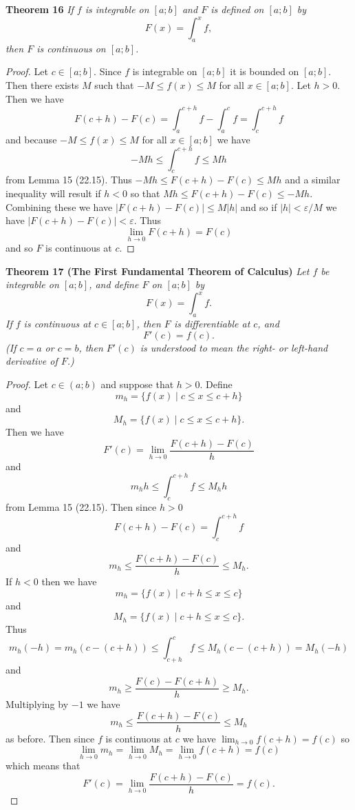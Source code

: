 \documentclass{article}
\begin{document}
\begin{flushleft}
\textbf{Theorem 16}
\textsl{If $f$ is integrable on $[a;b]$ and $F$ is defined on $[a;b]$ by
\[
F(x) = \int_a^x f,
\]
then $F$ is continuous on $[a;b]$.}
\begin{proof}
Let $c \in [a;b]$. Since $f$ is integrable on $[a;b]$ it is bounded on $[a;b]$. Then there exists $M$ such that $-M \leq f(x) \leq M$ for all $x \in [a;b]$. Let $h > 0$. Then we have
\[
F(c+h) - F(c) = \int_a^{c+h} f - \int_a^c f = \int_c^{c+h} f
\]
and because $-M \leq f(x) \leq M$ for all $x \in [a;b]$ we have
\[
-M h \leq \int_c^{c+h} f \leq M h
\]
from Lemma 15 (22.15). Thus $-Mh \leq F(c+h) - F(c) \leq Mh$ and a similar inequality will result if $h < 0$ so that $Mh \leq F(c+h) - F(c) \leq -Mh$. Combining these we have $|F(c+h) - F(c)| \leq M |h|$ and so if $|h| < \varepsilon / M$ we have $|F(c+h) - F(c)| < \varepsilon$. Thus
\[
\lim_{h \rightarrow 0} F(c+h) = F(c)
\]
and so $F$ is continuous at $c$.
\end{proof}

\textbf{Theorem 17 (The First Fundamental Theorem of Calculus)}
\textsl{Let $f$ be integrable on $[a;b]$, and define $F$ on $[a;b]$ by
\[
F(x) = \int_a^x f.
\]
If $f$ is continuous at $c \in [a;b]$, then $F$ is differentiable at $c$, and
\[
F'(c) = f(c).
\]
(If $c=a$ or $c=b$, then $F'(c)$ is understood to mean the right- or left-hand derivative of $F$.)}
\begin{proof}
Let $c \in (a;b)$ and suppose that $h > 0$. Define
\[
m_h = \{f(x) \mid c \leq x \leq c+h\}
\]
and
\[
M_h = \{f(x) \mid c \leq x \leq c+h\}.
\]
Then we have
\[
F'(c) = \lim_{h \rightarrow 0} \frac{F(c+h) - F(c)}{h}
\]
and
\[
m_h h \leq \int_c^{c+h} f \leq M_h h
\]
from Lemma 15 (22.15). Then since $h > 0$
\[
F(c+h) - F(c) = \int_c^{c+h} f
\]
and
\[
m_h \leq \frac{F(c+h) - F(c)}{h} \leq M_h.
\]
If $h < 0$ then we have
\[
m_h = \{f(x) \mid c+h \leq x \leq c\}
\]
and
\[
M_h = \{f(x) \mid c+h \leq x \leq c\}.
\]
Thus
\[
m_h(-h) = m_h (c-(c+h)) \leq \int_{c+h}^c f \leq M_h (c-(c+h)) = M_h(-h)
\]
and
\[
m_h \geq \frac{F(c) - F(c+h)}{h} \geq M_h.
\]
Multiplying by $-1$ we have
\[
m_h \leq \frac{F(c+h) - F(c)}{h} \leq M_h
\]
as before. Then since $f$ is continuous at $c$ we have $\lim_{h \rightarrow 0} f(c+h) = f(c)$ so
\[
\lim_{h \rightarrow 0} m_h = \lim_{h \rightarrow 0} M_h = \lim_{h \rightarrow 0} f(c+h) = f(c)
\]
which means that
\[
F'(c) = \lim_{h \rightarrow 0} \frac{F(c+h) - F(c)}{h} = f(c).
\]
\end{proof}


\end{flushleft}
\end{document}
